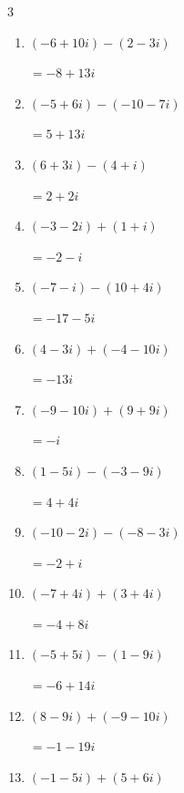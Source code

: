 \begin{multicols}{3}
\begin{enumerate}
        $\displaystyle =-15-11i$

  \item $\displaystyle (-6+10i) - (2-3i)$

        $\displaystyle =-8+13i$

  \item $\displaystyle (-5+6i) - (-10-7i)$

        $\displaystyle =5+13i$

  \item $\displaystyle (6+3i) - (4+i)$

        $\displaystyle =2+2i$

  \item $\displaystyle (-3-2i) + (1+i)$

        $\displaystyle =-2-i$

  \item $\displaystyle (-7-i) - (10+4i)$

        $\displaystyle =-17-5i$

  \item $\displaystyle (4-3i) + (-4-10i)$

        $\displaystyle =-13i$

  \item $\displaystyle (-9-10i) + (9+9i)$

        $\displaystyle =-i$

  \item $\displaystyle (1-5i) - (-3-9i)$

        $\displaystyle =4+4i$

  \item $\displaystyle (-10-2i) - (-8-3i)$

        $\displaystyle =-2+i$

  \item $\displaystyle (-7+4i) + (3+4i)$

        $\displaystyle =-4+8i$

  \item $\displaystyle (-5+5i) - (1-9i)$

        $\displaystyle =-6+14i$

\columnbreak %

\resetques

  \item $\displaystyle (8-9i) + (-9-10i)$

        $\displaystyle =-1-19i$

  \item $\displaystyle (-1-5i) + (5+6i)$


\end{enumerate}
\end{multicols}
